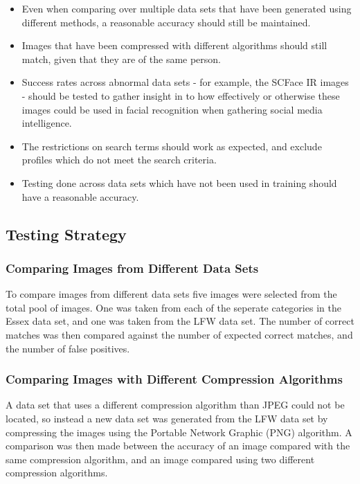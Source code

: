 \documentclass[12pt]{article}
\begin{document}
\begin{itemize}

\item{Even when comparing over multiple data sets that have been generated using different methods, a reasonable accuracy should still be maintained.}
\item{Images that have been compressed with different algorithms should still match, given that they are of the same person.}
\item{Success rates across abnormal data sets - for example, the SCFace IR images - should be tested to gather insight in to how effectively or otherwise these images could be used in facial recognition when gathering social media intelligence.}
\item{The restrictions on search terms should work as expected, and exclude profiles which do not meet the search criteria.}
\item{Testing done across data sets which have not been used in training should have a reasonable accuracy.}
\end{itemize}

\subsection{Testing Strategy}
\subsubsection{Comparing Images from Different Data Sets}
To compare images from different data sets five images were selected from the total pool of images. One was taken from each of the seperate categories in the Essex data set, and one was taken from the LFW data set. The number of correct matches was then compared against the number of expected correct matches, and the number of false positives.

\subsubsection{Comparing Images with Different Compression Algorithms}
A data set that uses a different compression algorithm than JPEG could not be located, so instead a new data set was generated from the LFW data set by compressing the images using the Portable Network Graphic (PNG) algorithm. A comparison was then made between the accuracy of an image compared with the same compression algorithm, and an image compared using two different compression algorithms.
\end{document}
